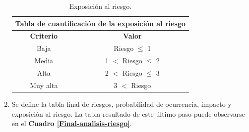 \begin{enumerate}
    \begin{table}[h]
        \centering
        \begin{tabular}{|c|c|}
            \hline
            \multicolumn{2}{|c|}{{\bf Tabla de cuantificación de la exposición al riesgo}}  \\ \hline
            {\bf Criterio}      & {\bf Valor}                                               \\ \hline
             Baja      & Riesgo $\leq$ 1          \\ \hline
             Media     & 1 $<$ Riesgo $\leq$ 2    \\ \hline
             Alta      & 2 $<$ Riesgo $\leq$ 3    \\ \hline
             Muy alta  & 3 $<$ Riesgo             \\ \hline
        \end{tabular}
        \caption{Exposición al riesgo.}
        \label{Riesgo-exposicion}
    \end{table}
    
    \item Se define la tabla final de riesgos, probabilidad de ocurrencia, impacto y exposición al riesgo. 
    La tabla resultado de este último paso puede observarse en el \textbf{Cuadro \ref{Final-analisis-riesgo}}.
    

\end{enumerate}
